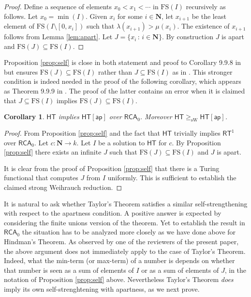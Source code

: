 \documentclass[a4paper,11pt]{article}
\newtheorem{corollary}{Corollary}
\newcommand\Nat{\mathbf{N}}
\newcommand\RCA{\mathsf{RCA}}
\newcommand\HT{\mathsf{HT}}
\newcommand\RT{\mathsf{RT}}
\newcommand\FS{\mathrm{FS}}
\newcommand\sW{\mathrm{sW}}
\newcommand\ap{\mathsf{ap}}
\begin{document}
\begin{proof}
Define a sequence of elements $x_0 < x_1 < \cdots$ in $\FS(I)$ recursively as follows. Let $x_0 = \min(I)$. Given $x_i$ for some $i\in\Nat$, 
let $x_{i+1}$ be the least element of $\FS(I \setminus [0, x_i])$ such that $\lambda(x_{i+1}) > \mu(x_i)$.
The existence of $x_{i+1}$ follows from Lemma \ref{lem:apart}. Let $J = \{ x_i \,:\, i \in\Nat\}$. By construction $J$ is apart and $\FS(J)\subseteq \FS(I)$.
\end{proof}

Proposition \ref{prop:self} is close in both statement and proof to Corollary 9.9.8 in \cite{Dza-Mum:22} but ensures $\FS(J)\subseteq \FS(I)$
rather than $J \subseteq \FS(I)$ as in \cite{Dza-Mum:22}. This stronger condition is indeed needed in the proof of the following 
corollary, which appears as Theorem 9.9.9 in \cite{Dza-Mum:22}. The proof of the latter contains an error when it is claimed that
$J \subseteq \FS(I)$ implies $\FS(J) \subseteq \FS(I)$. 

\begin{corollary}\label{cor:HTap}
$\HT$ implies $\HT[\ap]$ over $\RCA_0$. Moreover $\HT \geq_{\sW}\HT[\ap]$.
\end{corollary}

\begin{proof}
From Proposition \ref{prop:self} and the fact that $\HT$ trivially implies $\RT^1$ over $\RCA_0$. 
Let $c:\Nat \to k$. Let $I$ be a solution to $\HT$ for $c$. By Proposition \ref{prop:self} there exists an infinite $J$ such that
$\FS(J)\subseteq \FS(I)$ and $J$ is apart. 

It is clear from the proof of Proposition \ref{prop:self} that there is a Turing functional that computes $J$ from $I$ uniformly.
This is sufficient to establish the claimed strong Weihrauch reduction.
\end{proof}

It is natural to ask whether Taylor's Theorem satisfies a similar self-strengthening with respect to the apartness 
condition. A positive answer is expected by considering the finite unions version of the theorem. Yet to establish the result in 
$\RCA_0$ the situation has to be analyzed more closely as we have done above for Hindman's Theorem. 
As observed by one of the reviewers of the present paper, the above argument does not immediately apply to 
the case of Taylor's Theorem. Indeed, what the min-term (or max-term) of a number is depends on whether that number
is seen as a sum of elements of $I$ or as a sum of elements of $J$, in the notation of Proposition \ref{prop:self} above.
Nevertheless Taylor's Theorem {\em does} imply its own self-strenghtening with apartness, as we next prove. 
\end{document}
